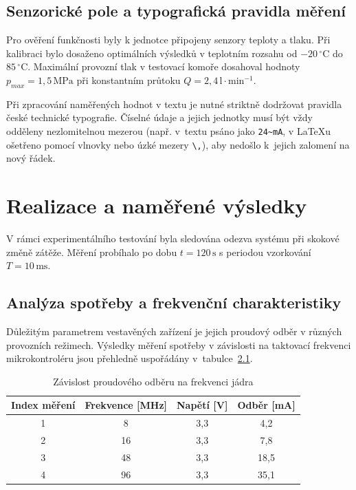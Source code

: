 \documentclass[FM,SP]{tulthesis}
\begin{document}
\section{Senzorické pole a typografická pravidla měření}
Pro ověření funkčnosti byly k jednotce připojeny senzory teploty a tlaku. Při kalibraci bylo dosaženo optimálních výsledků v teplotním rozsahu od $-20\,^{\circ}\mathrm{C}$ do $85\,^{\circ}\mathrm{C}$. Maximální provozní tlak v testovací komoře dosahoval hodnoty $p_{max} = 1,5\,\mathrm{MPa}$ při konstantním průtoku $Q = 2,4\,\mathrm{l\cdot min^{-1}}$. 

Při zpracování naměřených hodnot v textu je nutné striktně dodržovat pravidla české technické typografie. Číselné údaje a jejich jednotky musí být vždy odděleny nezlomitelnou mezerou (např. v~textu psáno jako \texttt{24\textasciitilde mA}, v \LaTeX{}u ošetřeno pomocí vlnovky nebo úzké mezery \texttt{\textbackslash,}), aby nedošlo k~jejich zalomení na nový řádek.

\chapter{Realizace a naměřené výsledky}
V rámci experimentálního testování byla sledována odezva systému při skokové změně zátěže. Měření probíhalo po dobu $t = 120\,\mathrm{s}$ s periodou vzorkování $T = 10\,\mathrm{ms}$.

\section{Analýza spotřeby a frekvenční charakteristiky}
Důležitým parametrem vestavěných zařízení je jejich proudový odběr v různých provozních režimech. Výsledky měření spotřeby v závislosti na taktovací frekvenci mikrokontroléru jsou přehledně uspořádány v~tabulce~\ref{tab:spotreba_mcu}.

\begin{table}[htbp]
    \centering
    \caption{Závislost proudového odběru na frekvenci jádra}
    \label{tab:spotreba_mcu}
    \begin{tabular}{|c|c|c|c|}
        \hline
        \textbf{Index měření} & \textbf{Frekvence [MHz]} & \textbf{Napětí [V]} & \textbf{Odběr [mA]} \\ \hline
        1 & 8  & 3,3 & 4,2  \\ \hline
        2 & 16 & 3,3 & 7,8  \\ \hline
        3 & 48 & 3,3 & 18,5 \\ \hline
        4 & 96 & 3,3 & 35,1 \\ \hline
    \end{tabular}
\end{table}
\end{document}
